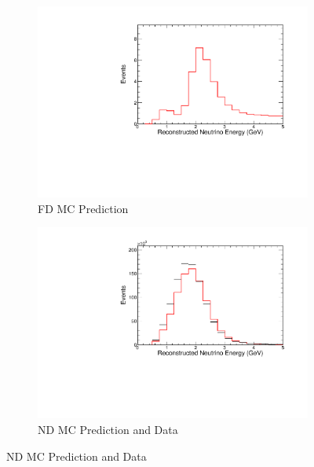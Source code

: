 {\begin{figure}
\end{figure}



\begin{figure}
\begin{center}
\begin{subfigure}[c]{0.49\textwidth}
\includegraphics[width=\textwidth]{figures/systs/prediction/fd_mc_prediction_MaNCRES.pdf}
\caption*{FD MC Prediction}
\end{subfigure}
\begin{subfigure}[c]{0.49\textwidth}
\includegraphics[width=\textwidth]{figures/systs/prediction/nd_mc_prediction_MaNCRES.pdf}
\caption*{ND MC Prediction and Data}
\end{subfigure}

\vspace{20pt}


\end{center}
\end{figure}}
